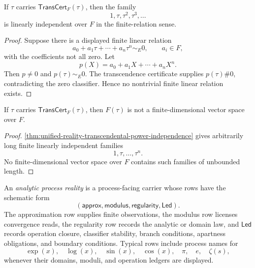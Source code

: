 \begin{theorem}
\label{thm:unified-reality-transcendental-power-independence}
If $\tau$ carries $\mathsf{TransCert}_F(\tau)$, then the family
$$
1,\tau,\tau^2,\tau^3,\ldots
$$
is linearly independent over $F$ in the finite-relation sense.
\end{theorem}

\begin{proof}
Suppose there is a displayed finite linear relation
$$
a_0+a_1\tau+\cdots+a_n\tau^n\sim_E0,
\qquad
a_i\in F,
$$
with the coefficients not all zero. Let
$$
p(X)=a_0+a_1X+\cdots+a_nX^n.
$$
Then $p\neq0$ and $p(\tau)\sim_E0$. The transcendence certificate
supplies $p(\tau)\#0$, contradicting the zero classifier. Hence no
nontrivial finite linear relation exists.
\end{proof}

\begin{corollary}
\label{cor:unified-reality-transcendental-extension-not-finite-algebraic}
If $\tau$ carries $\mathsf{TransCert}_F(\tau)$, then $F(\tau)$ is not a
finite-dimensional vector space over $F$.
\end{corollary}

\begin{proof}
\autoref{thm:unified-reality-transcendental-power-independence} gives
arbitrarily long finite linearly independent families
$$
1,\tau,\ldots,\tau^n.
$$
No finite-dimensional vector space over $F$ contains such families of
unbounded length.
\end{proof}

\begin{definition}
\label{def:unified-reality-analytic-process-reality}
An \emph{analytic process reality} is a process-facing carrier whose
rows have the schematic form
$$
(\mathsf{approx},\mathsf{modulus},\mathsf{regularity},\mathsf{Led}).
$$
The approximation row supplies finite observations, the modulus row
licenses convergence reads, the regularity row records the analytic or
domain law, and $\mathsf{Led}$ records operation closure, classifier
stability, branch conditions, apartness obligations, and boundary
conditions. Typical rows include process names for
$$
\exp(x),\quad \log(x),\quad \sin(x),\quad \cos(x),\quad \pi,\quad e,
\quad \zeta(s),
$$
whenever their domains, moduli, and operation ledgers are displayed.
\end{definition}

